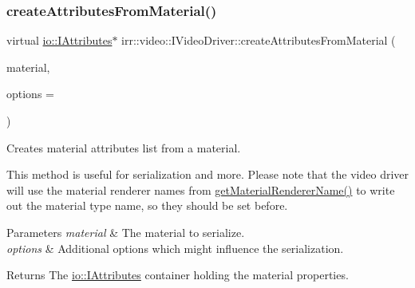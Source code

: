 \subsubsection{\texorpdfstring{create\+Attributes\+From\+Material()}{createAttributesFromMaterial()}\hspace{0.1cm}{\footnotesize\ttfamily [2/2]}}
{\footnotesize\ttfamily virtual \hyperlink{classirr_1_1io_1_1IAttributes}{io\+::\+I\+Attributes}$\ast$ irr\+::video\+::\+I\+Video\+Driver\+::create\+Attributes\+From\+Material (\begin{DoxyParamCaption}\item[{const \hyperlink{classirr_1_1video_1_1SMaterial}{video\+::\+S\+Material} \&}]{material,  }\item[{\hyperlink{structirr_1_1io_1_1SAttributeReadWriteOptions}{io\+::\+S\+Attribute\+Read\+Write\+Options} $\ast$}]{options = {} }\end{DoxyParamCaption})\hspace{0.3cm}{\ttfamily [pure virtual]}}



Creates material attributes list from a material. 

This method is useful for serialization and more. Please note that the video driver will use the material renderer names from \hyperlink{classirr_1_1video_1_1IVideoDriver_ac6f8c53abcd5a24d94c84185b0ef65e0}{get\+Material\+Renderer\+Name()} to write out the material type name, so they should be set before. 
\begin{DoxyParams}{Parameters}
{\em material} & The material to serialize. \\
\hline
{\em options} & Additional options which might influence the serialization. \\
\hline
\end{DoxyParams}
\begin{DoxyReturn}{Returns}
The \hyperlink{classirr_1_1io_1_1IAttributes}{io\+::\+I\+Attributes} container holding the material properties. 
\end{DoxyReturn}
\mbox{\label{classirr_1_1video_1_1IVideoDriver_aee1578fdd92118665755f31c0dd1dbb5}} 
